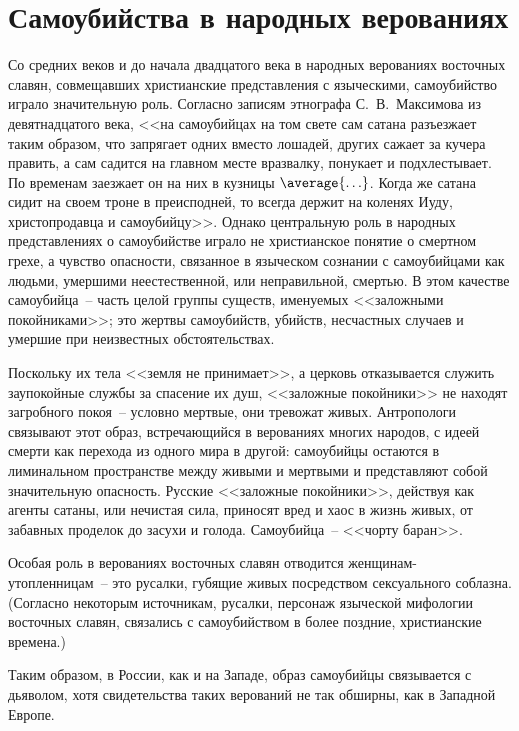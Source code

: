 \documentclass[pscyr,titlepage,chapters]{hedreport}
\begin{document}
  \section{Самоубийства в народных верованиях}
  
  Со средних веков и до начала
  двадцатого века в народных верованиях восточных славян, совмещавших
  христианские представления с языческими, самоубийство играло значительную
  роль. Согласно записям этнографа С.~В.~Максимова из девятнадцатого века, <<на
  самоубийцах на том свете сам сатана разъезжает таким образом, что запрягает
  одних вместо лошадей, других сажает за кучера править, а сам садится на
  главном месте вразвалку, понукает и подхлестывает. По временам заезжает он на
  них в кузницы \( \average{\ldots} \). Когда же сатана сидит на своем троне в
  преисподней, то всегда держит на коленях Иуду, христопродавца и самоубийцу>>.
  Однако центральную роль в народных представлениях о самоубийстве играло не
  христианское понятие о смертном грехе, а чувство опасности, связанное в
  языческом сознании с самоубийцами как людьми, умершими неестественной, или
  неправильной, смертью. В этом качестве самоубийца~-- часть целой группы
  существ, именуемых <<заложными покойниками>>; это жертвы самоубийств, убийств,
  несчастных случаев и умершие при неизвестных обстоятельствах.

  Поскольку их тела <<земля не принимает>>, а церковь отказывается служить
  заупокойные службы за спасение их душ, <<заложные покойники>> не находят
  загробного покоя~-- условно мертвые, они тревожат живых. Антропологи связывают
  этот образ, встречающийся в верованиях многих народов, с идеей смерти как
  перехода из одного мира в другой: самоубийцы остаются в лиминальном
  пространстве между живыми и мертвыми и представляют собой значительную
  опасность. Русские <<заложные покойники>>, действуя как агенты сатаны, или
  нечистая сила, приносят вред и хаос в жизнь живых, от забавных проделок до
  засухи и голода. Самоубийца~-- <<чорту баран>>.

  Особая роль в верованиях восточных славян отводится женщинам-утоп\-ленницам~--
  это русалки, губящие живых посредством сексуального соблазна. (Согласно
  некоторым источникам, русалки, персонаж языческой мифологии восточных славян,
  связались с самоубийством в более поздние, христианские времена.)

  Таким образом, в России, как и на Западе, образ самоубийцы связывается с
  дьяволом, хотя свидетельства таких верований не так обширны, как в Западной
  Европе.
\end{document}
